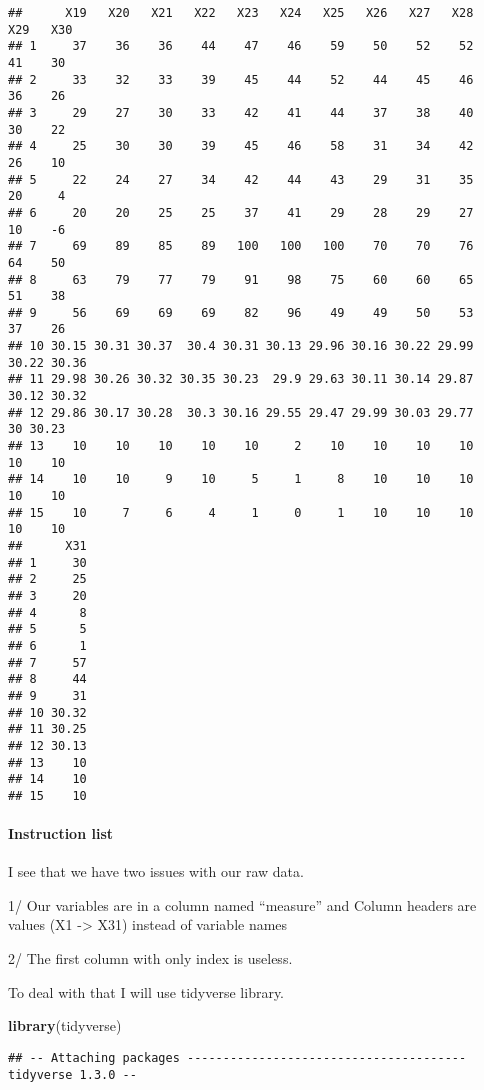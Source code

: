 \documentclass[
]{article}
\newenvironment{Shaded}{\begin{snugshade}}{\end{snugshade}}
\newcommand{\KeywordTok}[1]{\textcolor[rgb]{0.13,0.29,0.53}{\textbf{#1}}}
\newcommand{\NormalTok}[1]{#1}
\begin{document}
\begin{verbatim}
##      X19   X20   X21   X22   X23   X24   X25   X26   X27   X28   X29   X30
## 1     37    36    36    44    47    46    59    50    52    52    41    30
## 2     33    32    33    39    45    44    52    44    45    46    36    26
## 3     29    27    30    33    42    41    44    37    38    40    30    22
## 4     25    30    30    39    45    46    58    31    34    42    26    10
## 5     22    24    27    34    42    44    43    29    31    35    20     4
## 6     20    20    25    25    37    41    29    28    29    27    10    -6
## 7     69    89    85    89   100   100   100    70    70    76    64    50
## 8     63    79    77    79    91    98    75    60    60    65    51    38
## 9     56    69    69    69    82    96    49    49    50    53    37    26
## 10 30.15 30.31 30.37  30.4 30.31 30.13 29.96 30.16 30.22 29.99 30.22 30.36
## 11 29.98 30.26 30.32 30.35 30.23  29.9 29.63 30.11 30.14 29.87 30.12 30.32
## 12 29.86 30.17 30.28  30.3 30.16 29.55 29.47 29.99 30.03 29.77    30 30.23
## 13    10    10    10    10    10     2    10    10    10    10    10    10
## 14    10    10     9    10     5     1     8    10    10    10    10    10
## 15    10     7     6     4     1     0     1    10    10    10    10    10
##      X31
## 1     30
## 2     25
## 3     20
## 4      8
## 5      5
## 6      1
## 7     57
## 8     44
## 9     31
## 10 30.32
## 11 30.25
## 12 30.13
## 13    10
## 14    10
## 15    10
\end{verbatim}

\hypertarget{instruction-list}{%
\paragraph{Instruction list}\label{instruction-list}}

I see that we have two issues with our raw data.

1/ Our variables are in a column named ``measure'' and Column headers
are values (X1 -\textgreater{} X31) instead of variable names

2/ The first column with only index is useless.

To deal with that I will use tidyverse library.

\begin{Shaded}
\begin{Highlighting}[]
\KeywordTok{library}\NormalTok{(tidyverse)}
\end{Highlighting}
\end{Shaded}

\begin{verbatim}
## -- Attaching packages --------------------------------------- tidyverse 1.3.0 --
\end{verbatim}
\end{document}
